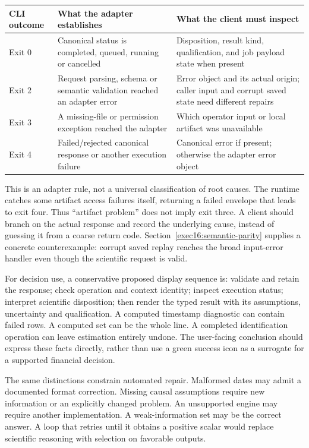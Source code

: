 \begin{center}
\begin{tabularx}{\textwidth}{P{.19\textwidth}X X}
\toprule
CLI outcome & What the adapter establishes & What the client must inspect \\
\midrule
Exit 0 & Canonical status is completed, queued, running or cancelled &
Disposition, result kind, qualification, and job payload state when present \\
Exit 2 & Request parsing, schema or semantic validation reached an adapter error &
Error object and its actual origin; caller input and corrupt saved state need different repairs \\
Exit 3 & A missing-file or permission exception reached the adapter &
Which operator input or local artifact was unavailable \\
Exit 4 & Failed/rejected canonical response or another execution failure &
Canonical error if present; otherwise the adapter error object \\
\bottomrule
\end{tabularx}
\end{center}
This is an adapter rule, not a universal classification of root causes. The
runtime catches some artifact access failures itself, returning a failed
envelope that leads to exit four. Thus ``artifact problem'' does not imply
exit three. A client should branch on the actual response and record the
underlying cause, instead of guessing it from a coarse return code. Section~\ref{exec16:semantic-parity} supplies a concrete counterexample: corrupt saved replay reaches the broad input-error handler even though the scientific request is valid.

For decision use, a conservative proposed display sequence is: validate and
retain the response; check operation and context identity; inspect execution
status; interpret scientific disposition; then render the typed result with
its assumptions, uncertainty and qualification. A computed timestamp
diagnostic can contain failed rows. A computed set can be the whole line.
A completed identification operation can leave estimation entirely undone.
The user-facing conclusion should express these facts directly, rather than
use a green success icon as a surrogate for a supported financial decision.

The same distinctions constrain automated repair. Malformed dates may admit
a documented format correction. Missing causal assumptions require new
information or an explicitly changed problem. An unsupported engine may
require another implementation. A weak-information set may be the correct
answer. A loop that retries until it obtains a positive scalar would replace
scientific reasoning with selection on favorable outputs.

